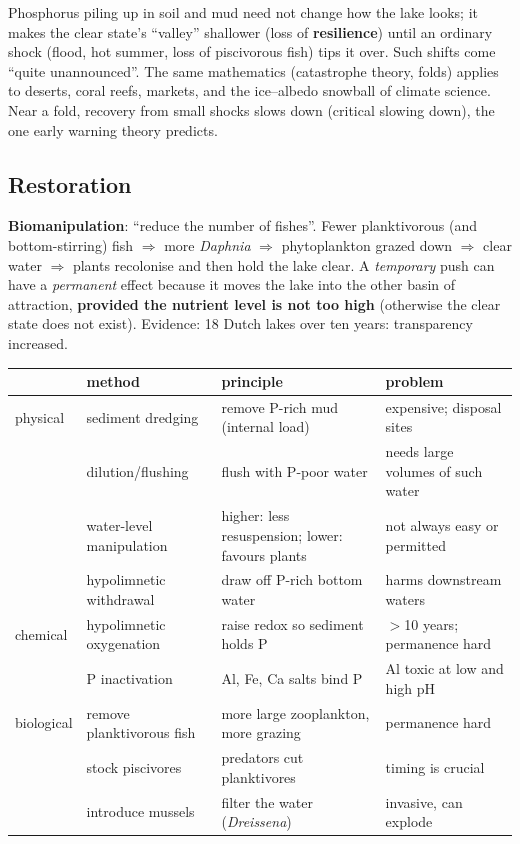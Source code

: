 \begin{keyidea}[: resilience]
Phosphorus piling up in soil and mud need not change how the lake looks; it makes the clear state's ``valley'' shallower
(loss of \textbf{resilience}) until an ordinary shock (flood, hot summer, loss of piscivorous fish) tips it over. Such
shifts come ``quite unannounced''. The same mathematics (catastrophe theory, folds) applies to deserts, coral reefs,
markets, and the ice--albedo snowball of climate science. Near a fold, recovery from small shocks slows down
(critical slowing down), the one early warning theory predicts.
\end{keyidea}

\subsection{Restoration}
\textbf{Biomanipulation}: ``reduce the number of fishes''. Fewer planktivorous (and bottom-stirring) fish $\Rightarrow$
more \emph{Daphnia} $\Rightarrow$ phytoplankton grazed down $\Rightarrow$ clear water $\Rightarrow$ plants recolonise and
then hold the lake clear. A \emph{temporary} push can have a \emph{permanent} effect because it moves the lake into the other
basin of attraction, \textbf{provided the nutrient level is not too high} (otherwise the clear state does not exist).
Evidence: 18 Dutch lakes over ten years: transparency increased.

\begin{center}\small
\begin{tabularx}{\textwidth}{llXX}
\toprule
& method & principle & problem\\\midrule
physical & sediment dredging & remove P-rich mud (internal load) & expensive; disposal sites\\
& dilution/flushing & flush with P-poor water & needs large volumes of such water\\
& water-level manipulation & higher: less resuspension; lower: favours plants & not always easy or permitted\\
& hypolimnetic withdrawal & draw off P-rich bottom water & harms downstream waters\\
chemical & hypolimnetic oxygenation & raise redox so sediment holds P & $>$10 years; permanence hard\\
& P inactivation & Al, Fe, Ca salts bind P & Al toxic at low and high pH\\
biological & remove planktivorous fish & more large zooplankton, more grazing & permanence hard\\
& stock piscivores & predators cut planktivores & timing is crucial\\
& introduce mussels & filter the water (\emph{Dreissena}) & invasive, can explode\\\bottomrule
\end{tabularx}
\end{center}

